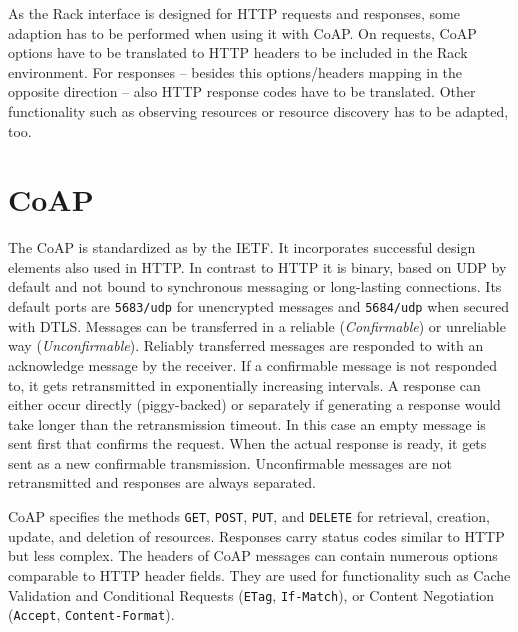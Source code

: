 	As the Rack interface is designed for \ac{HTTP} requests and responses,
	some adaption has to be performed when using it with \ac{CoAP}. On
	requests, \ac{CoAP} options have to be translated to \ac{HTTP} headers to
	be included in the Rack environment. For responses -- besides this
	options/headers mapping in the opposite direction -- also \ac{HTTP}
	response codes have to be translated. Other functionality such as observing
	resources or resource discovery has to be adapted, too.

\section{\acs{CoAP}}
\label{cha:background:coap}

	The \acl{CoAP} is standardized as \cite{coap} by the \ac{IETF}. It
	incorporates successful design elements also used in \ac{HTTP}. In contrast
	to \ac{HTTP} it is binary, based on \ac{UDP} by default and not bound to
	synchronous messaging or long-lasting connections. Its default ports are
	\texttt{5683/udp} for unencrypted messages and \texttt{5684/udp} when
	secured with \ac{DTLS}. Messages can be transferred in a reliable
	(\emph{Confirmable}) or unreliable way (\emph{Unconfirmable}). Reliably
	transferred messages are responded to with an acknowledge message by the
	receiver. If a confirmable message is not responded to, it gets
	retransmitted in exponentially increasing intervals. A response can either
	occur directly (piggy-backed) or separately if generating a response would
	take longer than the retransmission timeout. In this case an empty message
	is sent first that confirms the request. When the actual response is ready,
	it gets sent as a new confirmable transmission. Unconfirmable messages are
	not retransmitted and responses are always separated.
	
	\ac{CoAP} specifies the methods \texttt{GET}, \texttt{POST}, \texttt{PUT},
	and \texttt{DELETE} for retrieval, creation, update, and deletion of
	resources. Responses carry status codes similar to \ac{HTTP} but less
	complex. The headers of \ac{CoAP} messages can contain numerous options
	comparable to \ac{HTTP} header fields. They are used for functionality such
	as Cache Validation and Conditional Requests (\texttt{ETag},
	\texttt{If-Match}), or Content Negotiation (\texttt{Accept},
	\texttt{Content-Format}).

